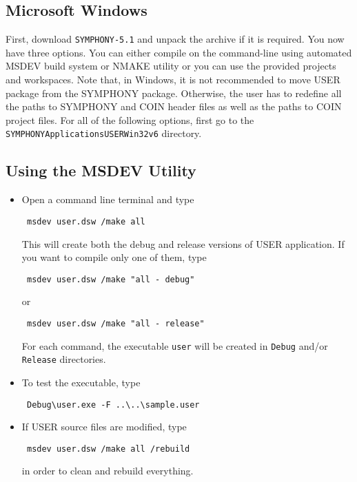 \subsection{Microsoft Windows}

First, download \texttt{SYMPHONY-5.1} and unpack the archive if it is 
required. You now have three options. You can either compile on the 
command-line using automated MSDEV build system or NMAKE utility or you can 
use the provided projects and workspaces. Note that, in Windows, it is not 
recommended to move USER package from the SYMPHONY package. Otherwise, 
the user has to redefine all the paths to SYMPHONY and COIN header files 
as well as the paths to COIN project files. For all of the following options, 
first go to the \texttt{SYMPHONY\bs Applications\bs USER\bs Win32\bs v6} 
directory.

\subsection{Using the MSDEV Utility}
\begin{itemize}
\item Open a command line terminal and type
{\color{Brown}
\begin{verbatim}
 msdev user.dsw /make all
\end{verbatim}
}
This will create both the debug and release versions of USER application. 
If you want to compile only one of them, type
{\color{Brown}
\begin{verbatim}
 msdev user.dsw /make "all - debug"
\end{verbatim}
}
or 
{\color{Brown}
\begin{verbatim}
 msdev user.dsw /make "all - release"
\end{verbatim}
}
For each command, the executable \texttt{user} will be created in 
\texttt{Debug} and/or \texttt{Release}
directories. 

\item To test the executable, type 
{\color{Brown}
\begin{verbatim}
 Debug\user.exe -F ..\..\sample.user
\end{verbatim}
}
\item If USER source files are modified, type 
{\color{Brown}
\begin{verbatim}
 msdev user.dsw /make all /rebuild
\end{verbatim}
}
in order to clean and rebuild everything.
\end{itemize} 

